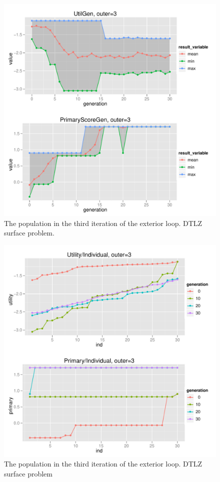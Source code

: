 \begin{figure}
  \centering
  \includegraphics[width=1.0\textwidth]{exp/nouncert/c3_surface_utilgen_03}
  \caption{The population in the third iteration of the exterior loop. DTLZ
    surface problem.}
  \label{c3_surface_utilgen_03}
\end{figure}

\begin{figure}
  \centering
  \includegraphics[width=1.0\textwidth]{exp/nouncert/c3_surface_utilind_03}
  \caption{The population in the third iteration of the exterior loop. DTLZ
    surface problem}
  \label{c3_surface_utilind_03}
\end{figure}

